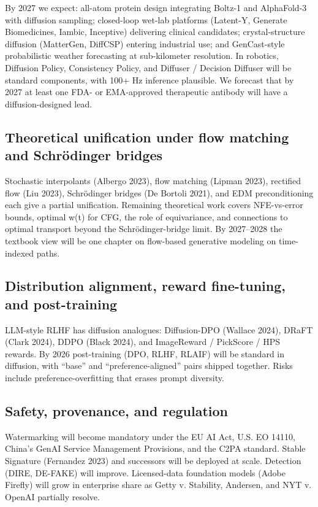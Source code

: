 By 2027 we expect: all-atom protein design integrating Boltz-1 and AlphaFold-3 with diffusion sampling; closed-loop wet-lab platforms (Latent-Y, Generate Biomedicines, Iambic, Inceptive) delivering clinical candidates; crystal-structure diffusion (MatterGen, DiffCSP) entering industrial use; and GenCast-style probabilistic weather forecasting at sub-kilometer resolution. In robotics, Diffusion Policy, Consistency Policy, and Diffuser / Decision Diffuser will be standard components, with 100+ Hz inference plausible. We forecast that by 2027 at least one FDA- or EMA-approved therapeutic antibody will have a diffusion-designed lead.

\subsection{Theoretical unification under flow matching and Schrödinger bridges}\label{theoretical-unification-under-flow-matching-and-schruxf6dinger-bridges}

Stochastic interpolants (Albergo 2023), flow matching (Lipman 2023), rectified flow (Liu 2023), Schrödinger bridges (De Bortoli 2021), and EDM preconditioning each give a partial unification. Remaining theoretical work covers NFE-vs-error bounds, optimal w(t) for CFG, the role of equivariance, and connections to optimal transport beyond the Schrödinger-bridge limit. By 2027--2028 the textbook view will be one chapter on flow-based generative modeling on time-indexed paths.

\subsection{Distribution alignment, reward fine-tuning, and post-training}\label{distribution-alignment-reward-fine-tuning-and-post-training}

LLM-style RLHF has diffusion analogues: Diffusion-DPO (Wallace 2024), DRaFT (Clark 2024), DDPO (Black 2024), and ImageReward / PickScore / HPS rewards. By 2026 post-training (DPO, RLHF, RLAIF) will be standard in diffusion, with ``base'' and ``preference-aligned'' pairs shipped together. Risks include preference-overfitting that erases prompt diversity.

\subsection{Safety, provenance, and regulation}\label{safety-provenance-and-regulation}

Watermarking will become mandatory under the EU AI Act, U.S. EO 14110, China's GenAI Service Management Provisions, and the C2PA standard. Stable Signature (Fernandez 2023) and successors will be deployed at scale. Detection (DIRE, DE-FAKE) will improve. Licensed-data foundation models (Adobe Firefly) will grow in enterprise share as Getty v. Stability, Andersen, and NYT v. OpenAI partially resolve.

